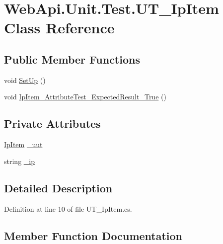\hypertarget{class_web_api_1_1_unit_1_1_test_1_1_u_t___ip_item}{}\section{Web\+Api.\+Unit.\+Test.\+U\+T\+\_\+\+Ip\+Item Class Reference}
\label{class_web_api_1_1_unit_1_1_test_1_1_u_t___ip_item}
\subsection*{Public Member Functions}
\begin{DoxyCompactItemize}
\item 
void \mbox{\hyperlink{class_web_api_1_1_unit_1_1_test_1_1_u_t___ip_item_a0c7303e0568ed68c03c4725d952972e7}{Set\+Up}} ()
\item 
void \mbox{\hyperlink{class_web_api_1_1_unit_1_1_test_1_1_u_t___ip_item_ace8a438fd64e45af9aba373f70a85f21}{Ip\+Item\+\_\+\+Attribute\+Test\+\_\+\+Expected\+Result\+\_\+\+True}} ()
\end{DoxyCompactItemize}
\subsection*{Private Attributes}
\begin{DoxyCompactItemize}
\item 
\mbox{\hyperlink{class_f_w_p_s_1_1_models_1_1_ip_item}{Ip\+Item}} \mbox{\hyperlink{class_web_api_1_1_unit_1_1_test_1_1_u_t___ip_item_a23d89e02012bf44b98a0866b7ef81df4}{\+\_\+uut}}
\item 
string \mbox{\hyperlink{class_web_api_1_1_unit_1_1_test_1_1_u_t___ip_item_a691ee55fa8d3ec41d9c9f85336e19e1f}{\+\_\+ip}}
\end{DoxyCompactItemize}


\subsection{Detailed Description}


Definition at line 10 of file U\+T\+\_\+\+Ip\+Item.\+cs.



\subsection{Member Function Documentation}
\mbox{\label{class_web_api_1_1_unit_1_1_test_1_1_u_t___ip_item_ace8a438fd64e45af9aba373f70a85f21}} 

